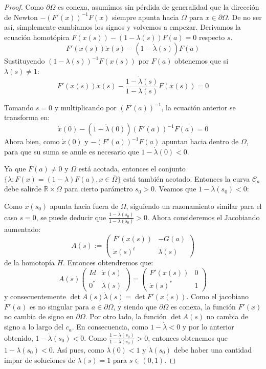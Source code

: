 \begin{proof}
	Como $\partial \Omega$ es conexa, asumimos sin pérdida de generalidad que la dirección de Newton $-(F'(x))^{-1}F(x)$ siempre apunta hacia $\Omega$ para $x \in \partial \Omega$. De no ser así, simplemente cambiamos los signos y volvemos a empezar. Derivamos la ecuación homotópica $F(x(s)) - (1-\lambda(s)) F(a)=0$ respecto $s$.
	\[ F'(x(s)) \dot{x}(s) - (1-\dot{\lambda}(s))F(a) \]
	Sustituyendo $(1-\lambda(s))^{-1}F(x(s))$ por $F(a)$ obtenemos que si $\lambda(s) \neq 1$:
	\[ F'(x(s)) \dot{x}(s) - \frac{1-\dot{\lambda}(s)}{1-\lambda(s)} F(x(s)) = 0 \]
	
	Tomando $s=0$ y multiplicando por $(F'(a))^{-1}$, la ecuación anterior se transforma en:
	\[ \dot{x}(0) - (1-\dot{\lambda}(0)) (F'(a))^{-1}F(a) = 0 \]
	Ahora bien, como $\dot{x}(0)$ y $-(F'(a))^{-1}F(a)$ apuntan hacia dentro de $\Omega$, para que su suma se anule es necesario que $1-\dot{\lambda}(0)<0$.
	
	Ya que $F(a) \neq 0$ y $\Omega$ está acotada, entonces el conjunto $\{\lambda : F(x) = (1-\lambda) F(a) , x \in \overline{\Omega}\}$ está también acotado.
	Entonces la curva $\mathcal{C}_a$ debe salirde $\mathbb{R} \times \Omega$ para cierto parámetro $s_0 >  0$.
	Veamos que $1-\lambda(s_{0}) < 0$:

	Como $\dot{x}(s_{0})$ apunta hacia fuera de $\Omega$, siguiendo un razonamiento similar para el caso $s=0$, se puede deducir que $\frac{1-\dot{\lambda}(s_{0})}{1-\lambda(s_{0})} > 0$. Ahora consideremos el Jacobiando aumentado:
	\begin{equation*}
		A(s) :=
		\begin{pmatrix}
			F'(x(s)) & -G(a) \\
			\dot{x}(s)^t & \dot{\lambda}(s)
		\end{pmatrix}
	\end{equation*}
de la homotopía $H$. Entonces obtendremos que:
	\begin{equation*}
		A(s)
		\begin{pmatrix}
			Id & \dot{x}(s) \\
			0^* & \dot{\lambda}(s)
		\end{pmatrix}
		=
		\begin{pmatrix}
			F'(x(s)) & 0 \\
			\dot{x}(s)^* & 1
		\end{pmatrix}
	\end{equation*}
y consecuentemente $\det A(s) \dot{\lambda}(s) = \det F'(x(s))$.
Como el jacobiano $F'(a)$ es no singular para $a \in \partial \Omega$, y siendo que $\partial \Omega$ es conexa, la función $F'(x)$ no cambia de signo en $\partial \Omega$.
Por otro lado, la función $\det A(s)$ no cambia de signo a lo largo del $c_{a}$.
En consecuencia, como $1-\dot{\lambda} < 0$ y por lo anterior obtenido, $1-\dot{\lambda}(s_{0}) < 0$.
Como $\frac{1-\dot{\lambda}(s_{0})}{1-\lambda(s_{0})} > 0$, entonces obtenemos que $1-\lambda(s_{0}) < 0$.
Así pues, como $\lambda(0) < 1$ y $\lambda(s_0)$ debe haber una cantidad impar de soluciones de $\lambda(s)=1$ para $s \in (0,1)$. 
\end{proof}

